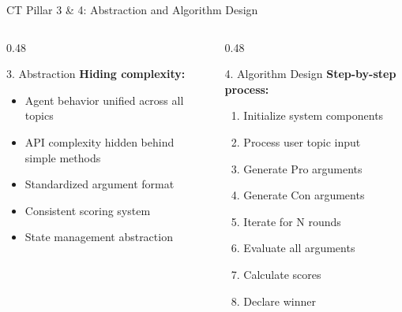 \documentclass[aspectratio=169]{beamer}
\begin{document}
\begin{frame}{CT Pillar 3 \& 4: Abstraction and Algorithm Design}
    \begin{columns}[t]
        \begin{column}{0.48\textwidth}
            \begin{block}{3. Abstraction}
                \textbf{Hiding complexity:}
                \begin{itemize}
                    \item Agent behavior unified across all topics
                    \item API complexity hidden behind simple methods
                    \item Standardized argument format
                    \item Consistent scoring system
                    \item State management abstraction
                \end{itemize}
            \end{block}
        \end{column}
        
        \begin{column}{0.48\textwidth}
            \begin{block}{4. Algorithm Design}
                \textbf{Step-by-step process:}
                \begin{enumerate}
                    \item Initialize system components
                    \item Process user topic input
                    \item Generate Pro arguments
                    \item Generate Con arguments
                    \item Iterate for N rounds
                    \item Evaluate all arguments
                    \item Calculate scores
                    \item Declare winner
                \end{enumerate}
            \end{block}
        \end{column}
    \end{columns}
\end{frame}

\end{document}
